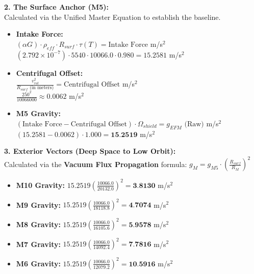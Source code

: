\documentclass[11pt, a4paper]{article}
\begin{document}
  \vspace{1.0em}
  \noindent \textbf{2. The Surface Anchor (M5):} \\
  \hspace*{1em} Calculated via the Unified Master Equation to establish the baseline.
  \begin{itemize}
    \item \textbf{Intake Force:} \\[0.5em]
    \hspace*{2em} $(\alpha G) \cdot \rho_{eff} \cdot R_{surf} \cdot \tau(T) = \text{Intake Force}$ m/s$^2$ \\[1em]
    \hspace*{2em} $(2.792 \times 10^{-7}) \cdot 5540 \cdot 10066.0 \cdot 0.980 = 15.2581$ m/s$^2$
    
    \item \textbf{Centrifugal Offset:} \\[0.5em]
    \hspace*{2em} $\frac{v_{rot}^2}{R_{surf} \text{ (in meters)}} = \text{Centrifugal Offset}$ m/s$^2$ \\[1em]
    \hspace*{2em} $\frac{250^2}{10066000} \approx 0.0062$ m/s$^2$
    
    \item \textbf{M5 Gravity:} \\[0.5em]
    \hspace*{2em} $(\text{Intake Force} - \text{Centrifugal Offset}) \cdot \Omega_{shield} = g_{EFM} \text{ (Raw)}$ m/s$^2$ \\[1em]
    \hspace*{2em} $(15.2581 - 0.0062) \cdot 1.000 = \textbf{15.2519}$ m/s$^2$
  \end{itemize}

  \clearpage
  \noindent \textbf{3. Exterior Vectors (Deep Space to Low Orbit):} \\
  \hspace*{1em} Calculated via the \textbf{Vacuum Flux Propagation} formula: $g_M = g_{M5} \cdot \left( \frac{R_{surf}}{R_M} \right)^2$
  \begin{itemize}
    \item \textbf{M10 Gravity:} $15.2519 \left( \frac{10066.0}{20132.0} \right)^2 = \textbf{3.8130}$ m/s$^2$
    \item \textbf{M9 Gravity:} $15.2519 \left( \frac{10066.0}{18118.8} \right)^2 = \textbf{4.7074}$ m/s$^2$
    \item \textbf{M8 Gravity:} $15.2519 \left( \frac{10066.0}{16105.6} \right)^2 = \textbf{5.9578}$ m/s$^2$
    \item \textbf{M7 Gravity:} $15.2519 \left( \frac{10066.0}{14092.4} \right)^2 = \textbf{7.7816}$ m/s$^2$
    \item \textbf{M6 Gravity:} $15.2519 \left( \frac{10066.0}{12079.2} \right)^2 = \textbf{10.5916}$ m/s$^2$
  \end{itemize}
\end{document}
